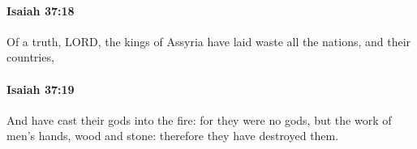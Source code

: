 		\paragraph{Isaiah 37:18} %
			\label{ISAIAH-37-18}

			Of a truth, LORD, the kings of Assyria have laid waste all the nations, and their countries,


		\paragraph{Isaiah 37:19} %
			\label{ISAIAH-37-19}

			And have cast their gods into the fire: for they were no gods, but the work of men's hands, wood and stone: therefore they have destroyed them.


